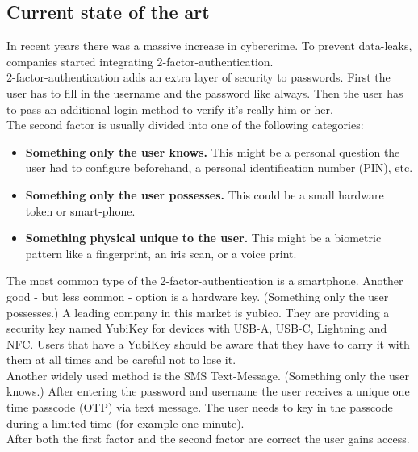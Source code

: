 \documentclass[conference]{IEEEtran}
\begin{document}
\subsection{Current state of the art}
In recent years there was a massive increase in cybercrime. To prevent data-leaks, companies started integrating 2-factor-authentication.\cite{b4}\\
2-factor-authentication adds an extra layer of security to passwords. First the user has to fill in the username and the password like always. Then the user has to pass an additional login-method to verify it's really him or her.\\
The second factor is usually divided into one of the following categories:
\begin{itemize}
\item \textbf{Something only the user knows.}  This might be a personal question the user had to configure beforehand, a personal identification number (PIN), etc.
\item \textbf{Something only the user possesses.} This could be a small hardware token or smart-phone.
\item \textbf{Something physical unique to the user.} This might be a  biometric pattern like a fingerprint, an iris scan, or a voice print. 
\end{itemize}
The most common type of the 2-factor-authentication is a smartphone. Another good - but less common - option is a hardware key. (Something only the user possesses.) A leading company in this market is yubico. They are providing a security key named YubiKey for devices with USB-A, USB-C, Lightning and NFC. Users that have a YubiKey should be aware that they have to carry it with them at all times and be careful not to lose it.\cite{b11}\\
Another widely used method is the SMS Text-Message. (Something only the user knows.) After entering the password and username the user receives a unique one time passcode (OTP) via text message. The user needs to key in the passcode during a limited time (for example one minute).\\
After both the first factor and the second factor are correct the user gains access.
                                                                                               
\end{document}
